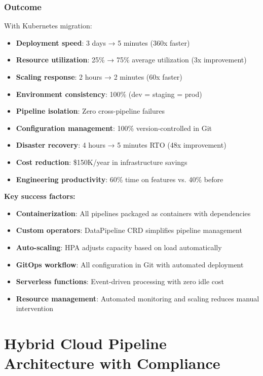 \subsubsection{Outcome}

With Kubernetes migration:

\begin{itemize}
    \item \textbf{Deployment speed}: 3 days → 5 minutes (360x faster)
    \item \textbf{Resource utilization}: 25\% → 75\% average utilization (3x improvement)
    \item \textbf{Scaling response}: 2 hours → 2 minutes (60x faster)
    \item \textbf{Environment consistency}: 100\% (dev = staging = prod)
    \item \textbf{Pipeline isolation}: Zero cross-pipeline failures
    \item \textbf{Configuration management}: 100\% version-controlled in Git
    \item \textbf{Disaster recovery}: 4 hours → 5 minutes RTO (48x improvement)
    \item \textbf{Cost reduction}: \$150K/year in infrastructure savings
    \item \textbf{Engineering productivity}: 60\% time on features vs. 40\% before
\end{itemize}

\textbf{Key success factors:}
\begin{itemize}
    \item \textbf{Containerization}: All pipelines packaged as containers with dependencies
    \item \textbf{Custom operators}: DataPipeline CRD simplifies pipeline management
    \item \textbf{Auto-scaling}: HPA adjusts capacity based on load automatically
    \item \textbf{GitOps workflow}: All configuration in Git with automated deployment
    \item \textbf{Serverless functions}: Event-driven processing with zero idle cost
    \item \textbf{Resource management}: Automated monitoring and scaling reduces manual intervention
\end{itemize}

\section{Hybrid Cloud Pipeline Architecture with Compliance}

